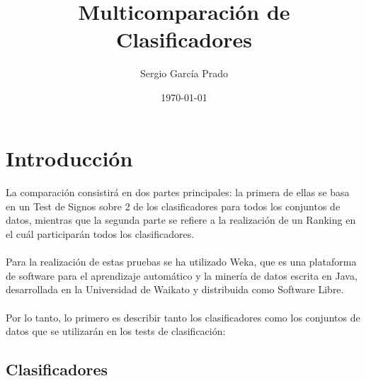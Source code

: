 \documentclass[10pt, a4paper,spanish]{article}
\title{\vspace{-15mm}\fontsize{24pt}{10pt}\selectfont\textbf{Multicomparación de \\ Clasificadores}} %
\author{Sergio García Prado}
\date{\today}
\begin{document}
	\maketitle %

	\thispagestyle{fancy} %


	\begin{abstract}
		\noindent
	\end{abstract}


	\section{Introducción}

        \paragraph{}
		La comparación consistirá en dos partes principales: la primera de ellas se basa en un Test de Signos sobre 2 de los clasificadores para todos los conjuntos de datos, mientras que la segunda parte se refiere a la realización de un Ranking en el cuál participarán todos los clasificadores.

		\paragraph{}
		Para la realización de estas pruebas se ha utilizado Weka, que es una plataforma de software para el aprendizaje automático y la minería de datos escrita en Java, desarrollada en la Universidad de Waikato y distribuida como Software Libre.

		\paragraph{}
		Por lo tanto, lo primero es describir tanto los clasificadores como los conjuntos de datos que se utilizarán en los tests de clasificación:

		\subsection{Clasificadores}
\end{document}
